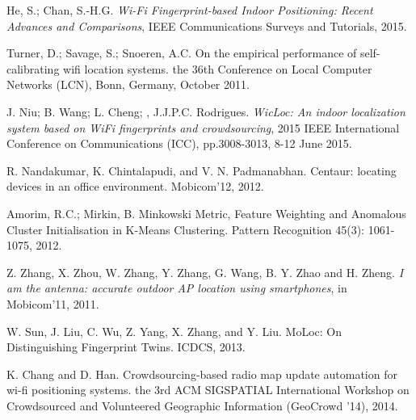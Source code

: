 \documentclass[10pt, conference, letterpaper]{IEEEtran}
\begin{document}
\begin{thebibliography}{1}






He, S.; Chan, S.-H.G. \emph{Wi-Fi Fingerprint-based Indoor Positioning: Recent Advances and Comparisons}, IEEE Communications Surveys and Tutorials, 2015.



Turner, D.; Savage, S.; Snoeren, A.C. On the empirical performance of self-calibrating wifi location systems. the 36th Conference on Local Computer Networks (LCN), Bonn, Germany, October 2011.



J. Niu; B. Wang; L. Cheng; , J.J.P.C. Rodrigues. \emph{WicLoc: An indoor localization system based on WiFi fingerprints and crowdsourcing}, 2015 IEEE International Conference on Communications (ICC), pp.3008-3013, 8-12 June 2015.


R. Nandakumar, K. Chintalapudi, and V. N. Padmanabhan. Centaur: locating devices in an office environment. Mobicom'12, 2012.




Amorim, R.C.; Mirkin, B. Minkowski Metric, Feature Weighting and Anomalous Cluster Initialisation in K-Means Clustering. Pattern Recognition 45(3): 1061-1075, 2012.

Z. Zhang, X. Zhou, W. Zhang, Y. Zhang, G. Wang, B. Y. Zhao and H. Zheng. \emph{I am the antenna: accurate outdoor AP location using smartphones}, in Mobicom'11, 2011.

 W. Sun, J. Liu, C. Wu, Z. Yang, X. Zhang, and Y. Liu. MoLoc: On Distinguishing Fingerprint Twins. ICDCS, 2013.
 
K. Chang and D. Han. Crowdsourcing-based radio map update automation for wi-fi positioning systems. the 3rd ACM SIGSPATIAL International Workshop on Crowdsourced and Volunteered Geographic Information (GeoCrowd '14), 2014.





\end{thebibliography}
\end{document}
